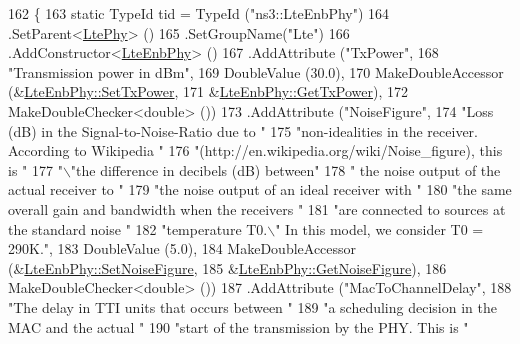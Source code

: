 \begin{DoxyCode}
162 \{
163   \textcolor{keyword}{static} TypeId tid = TypeId (\textcolor{stringliteral}{"ns3::LteEnbPhy"})
164     .SetParent<\hyperlink{classns3_1_1LtePhy_a14ba34ce91bb83a5eebb4690e0c2cfbf}{LtePhy}> ()
165     .SetGroupName(\textcolor{stringliteral}{"Lte"})
166     .AddConstructor<\hyperlink{classns3_1_1LteEnbPhy_a879bdf4f544a2d7fd73017b371953ee7}{LteEnbPhy}> ()
167     .AddAttribute (\textcolor{stringliteral}{"TxPower"},
168                    \textcolor{stringliteral}{"Transmission power in dBm"},
169                    DoubleValue (30.0),
170                    MakeDoubleAccessor (&\hyperlink{classns3_1_1LteEnbPhy_a3dff39fa0c6cf4b44dece689ad79ec2c}{LteEnbPhy::SetTxPower}, 
171                                        &\hyperlink{classns3_1_1LteEnbPhy_a8ec718d2f1f6f6da5c36ca8325513d2d}{LteEnbPhy::GetTxPower}),
172                    MakeDoubleChecker<double> ())
173     .AddAttribute (\textcolor{stringliteral}{"NoiseFigure"},
174                    \textcolor{stringliteral}{"Loss (dB) in the Signal-to-Noise-Ratio due to "}
175                    \textcolor{stringliteral}{"non-idealities in the receiver.  According to Wikipedia "}
176                    \textcolor{stringliteral}{"(http://en.wikipedia.org/wiki/Noise\_figure), this is "}
177                    \textcolor{stringliteral}{"\(\backslash\)"the difference in decibels (dB) between"}
178                    \textcolor{stringliteral}{" the noise output of the actual receiver to "}
179                    \textcolor{stringliteral}{"the noise output of an ideal receiver with "}
180                    \textcolor{stringliteral}{"the same overall gain and bandwidth when the receivers "}
181                    \textcolor{stringliteral}{"are connected to sources at the standard noise "}
182                    \textcolor{stringliteral}{"temperature T0.\(\backslash\)"  In this model, we consider T0 = 290K."},
183                    DoubleValue (5.0),
184                    MakeDoubleAccessor (&\hyperlink{classns3_1_1LteEnbPhy_a95f51fd03ed9b5a4342c2ce9a0bfd048}{LteEnbPhy::SetNoiseFigure}, 
185                                        &\hyperlink{classns3_1_1LteEnbPhy_a937cd54335f941fb584d457a899e6c82}{LteEnbPhy::GetNoiseFigure}),
186                    MakeDoubleChecker<double> ())
187     .AddAttribute (\textcolor{stringliteral}{"MacToChannelDelay"},
188                    \textcolor{stringliteral}{"The delay in TTI units that occurs between "}
189                    \textcolor{stringliteral}{"a scheduling decision in the MAC and the actual "}
190                    \textcolor{stringliteral}{"start of the transmission by the PHY. This is "}

\end{DoxyCode}
